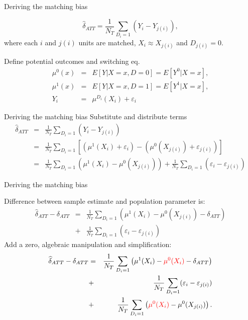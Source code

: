 \documentclass{beamer}
\begin{document}
\begin{frame}{Deriving the matching bias}
	
  \vspace{-5mm}
  $$
		\widehat{\delta}_{ATT} = \frac{1}{N_T} \sum_{D_i=1} (Y_i - Y_{j(i)}),
  $$
  where each $i$ and $j(i)$ units are matched, $X_i \approx X_{j(i)}$ and $D_{j(i)}=0$. 
	 
  \bigskip
  Define potential outcomes and switching eq.
		\begin{eqnarray*}
      \mu^0(x) &=& E[Y | X=x,D=0] = E[Y^0 | X=x],\\
      \mu^1(x) &=& E[Y | X=x,D=1] = E[Y^1 | X=x],\\
      Y_i &=& \mu^{D_i}(X_i) + \varepsilon_i
		\end{eqnarray*}
\end{frame}

\begin{frame}{Deriving the matching bias}
  Substitute and distribute terms
  \begin{eqnarray*}
    \widehat{\delta}_{ATT} &=& \frac{1}{N_T} \sum_{D_i=1} (Y_i - Y_{j(i)}) \\
    &=& \frac{1}{N_T} \sum_{D_i=1} \left[ (\mu^1(X_i) + \varepsilon_i) - (\mu^0(X_{j(i)}) + \varepsilon_{j(i)}) \right] \\
    &=&  \frac{1}{N_T} \sum_{D_i=1} (\mu^1(X_i) - \mu^0(X_{j(i)})) + \frac{1}{N_T} \sum_{D_i=1}(\varepsilon_i - \varepsilon_{j(i)})
  \end{eqnarray*}
\end{frame}
		

\begin{frame}{Deriving the matching bias}
	
Difference between sample estimate and population parameter is:
		\begin{eqnarray*}
		\widehat{\delta}_{ATT} - \delta_{ATT} &=& \frac{1}{N_T} \sum_{D_i=1} \left( \mu^1(X_i) - \mu^0(X_{j(i)}) - \delta_{ATT}\right) \\
		&+& \frac{1}{N_T} \sum_{D_i=1} (\varepsilon_i - \varepsilon_{j(i)})
		\end{eqnarray*}
Add a zero, algebraic manipulation and simplification:
		\begin{eqnarray*}
		\widehat{\delta}_{ATT} - \delta_{ATT} &=& \frac{1}{N_T} \sum_{D_i=1} \left( \mu^1(X_i) - \textcolor{red}{\mu^0(X_i)} - \delta_{ATT}\right) \\
		&+& \frac{1}{N_T} \sum_{D_i=1} (\varepsilon_i - \varepsilon_{j(i)}) \\
		&+& \frac{1}{N_T} \sum_{D_i=1} \left( \textcolor{red}{\mu^0(X_i)} - \mu^0(X_{j(i)}) \right).
		\end{eqnarray*}
\end{frame}
\end{document}
